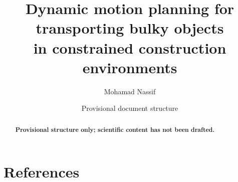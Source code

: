 \documentclass[12pt,a4paper,oneside]{report}
\title{Dynamic motion planning for transporting bulky objects\\
in constrained construction environments}
\author{Mohamad Nassif}
\date{Provisional document structure}
\begin{document}
\hypersetup{pageanchor=false}
\maketitle
\begin{abstract}
\noindent\textbf{Provisional structure only; scientific content has not been drafted.}
\end{abstract}
\clearpage
{}
\hypersetup{pageanchor=true}
\tableofcontents
\clearpage
{}




\chapter*{References}
% 
% 
\end{document}
